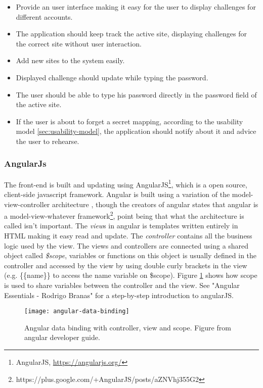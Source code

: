 \begin{itemize}
    \item Provide an user interface making it easy for the user to display challenges for different accounts.
    \item The application should keep track the active site, displaying challenges for the correct site without user interaction.
    \item Add new sites to the system easily. 
    \item Displayed challenge should update while typing the password.
    \item The user should be able to type his password directly in the password field of the active site.
    \item If the user is about to forget a secret mapping, according to the usability model \ref{sec:usability-model}, the application should notify about it and advice the user to rehearse.
\end{itemize}


\subsubsection{AngularJs}
The front-end is built and updating using AngularJS\footnote{AngularJS, \url{https://angularjs.org/}}, which is a open source, client-side javascript framework. Angular is built using a variation of the model-view-controller architecture \cite{mvc}, though the creators of angular states that angular is a model-view-whatever framework\footnote{https://plus.google.com/+AngularJS/posts/aZNVhj355G2}, point being that what the architecture is called isn't important. The \emph{view}s in angular is templates written entirely in HTML making it easy read and update. The \emph{controller} contains all the business logic used by the view. The views and controllers are connected using a shared object called \emph{\$scope}, variables or functions on this object is usually defined in the controller and accessed by the view by using double curly brackets in the view (e.g. \{\{name\}\} to access the name variable on \$scope). Figure \ref{angular-data-binding} shows how scope is used to share variables between the controller and the view. See "Angular Essentials - Rodrigo Branas"\cite{angularjs-book} for a step-by-step introduction to angularJS.

\begin{figure}[h]
    \texttt{[image: angular-data-binding]} 
    \caption{Angular data binding with controller, view and scope. Figure from angular developer guide.}
    \label{angular-data-binding}
\end{figure}


